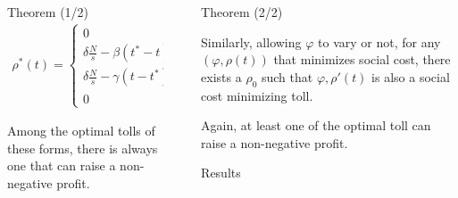 \documentclass[final, english]{beamer}
\newlength{\sepwid}
\newlength{\twocolwid}
\begin{document}
\begin{frame}[t]
\begin{columns}[t]
\begin{column}{\twocolwid}
\begin{alertblock}{Theorem (1/2)}
    \begin{equation*}
        \begin{array}{ll}
        \rho^*(t) = \left\{
            \begin{array}{ll}
                0 & \text{if } t<t^0\\
                \delta \frac{N}{s} - \beta (t^* - t) & \text{if } t\in [t^0, t^*]\\
                \delta \frac{N}{s} - \gamma (t-t^*) & \text{if } t \in [t^*, t^1]\\
                0 & \text{if } t>t^1
        \end{array}
        \right.
        & \text{with }\left\{
            \begin{array}{l}
                t^0 = t^* - \frac{\gamma}{\beta + \gamma} \cdot \frac{N_d}{\varphi s}\\
                t^1 = t^* + \frac{\beta}{\beta + \gamma} \cdot \frac{N_d}{\varphi s}
            \end{array}
            \right.
    \end{array}
    \end{equation*}
    
    Among the optimal tolls of these forms, there is always one that can raise a non-negative profit.

\end{alertblock}
    

\end{column} %

\begin{column}{\sepwid}\end{column} %

\begin{column}{\twocolwid} %

\begin{alertblock}{Theorem (2/2)}

    Similarly, allowing $\varphi$ to vary or not, for any $(\varphi, \rho (t))$ that minimizes social cost, there exists a $\rho_0$ such that $\varphi, \rho ' (t)$ is also a social cost minimizing toll.

    Again, at least one of the optimal toll can raise a non-negative profit.

\end{alertblock} 

\begin{block}{Results}


\end{block}
\end{column}
\end{columns}
\end{frame}
\end{document}
